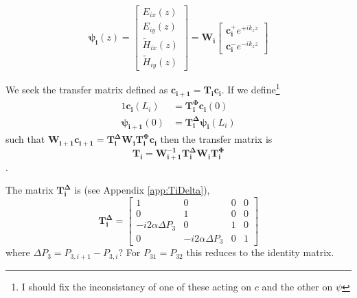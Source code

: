 \documentclass[notitlepage,nofootinbib]{revtex4-1}
\renewcommand{\vec}[1]{\mathbf{#1}}
\begin{document}
\begin{equation}
	\boldsymbol{\psi_i}(z)=
	\begin{bmatrix}
		E_{ix}(z) \\
		E_{iy}(z) \\
		\tilde{H}_{ix}(z) \\
		\tilde{H}_{iy}(z)
	\end{bmatrix}
	=
	\vec{W_i} \begin{bmatrix}
		\vec{c_i^+} e^{+ i k_z z} \\
		\vec{c_i^-} e^{- i k_z z}
	\end{bmatrix}
\end{equation}

We seek the transfer matrix defined as $ \vec{c_{i+1}} = \vec{T_i} \vec{c_i} $. If we define\footnote{I should fix the inconsistancy of one of these acting on $c$ and the other on $\psi$}
\begin{alignat}{1}
	\vec{c_i}(L_i) &= \vec{T_i^\Phi} \vec{c_i}(0) \\
	\boldsymbol{\psi_{i+1}}(0) &= \vec{T_i^\Delta} \boldsymbol{\psi_i}(L_i)
\end{alignat}
such that $ \vec{W_{i+1}} \vec{c_{i+1}} = \vec{T_i^\Delta} \vec{W_i} \vec{T_i^\Phi} \vec{c_i}$ then the transfer matrix is
\begin{equation}
	\vec{T_i} = \vec{W_{i+1}^{-1}} \vec{T_i^\Delta} \vec{W_i} \vec{T_i^\Phi}
\end{equation}.

The matrix $ \vec{T_i^\Delta} $ is (see Appendix \ref{app:TiDelta}),
\begin{equation}
	\vec{T_i^\Delta}
	=
	\begin{bmatrix}
		1 & 0 & 0 & 0 \\
		0 & 1 & 0 & 0 \\
		-i2\alpha \Delta P_3 & 0 & 1 & 0 \\
		0 & -i2\alpha \Delta P_3 & 0 & 1
	\end{bmatrix}
\end{equation}
where $ \Delta P_3 = P_{3,i+1} - P_{3,i}? $
For $ P_{31} = P_{32} $ this reduces to the identity matrix.
\end{document}
